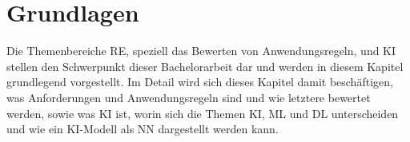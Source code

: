 \chapter{Grundlagen}
\label{chap:kapitel2}
Die Themenbereiche \ac{RE}, speziell das Bewerten von Anwendungsregeln, und \ac{KI} stellen den Schwerpunkt dieser Bachelorarbeit dar und werden in diesem Kapitel 
grundlegend vorgestellt. Im Detail wird sich dieses Kapitel damit beschäftigen, was Anforderungen und Anwendungsregeln sind und wie letztere bewertet werden,
sowie was \ac{KI} ist, worin sich die Themen \ac{KI}, \ac{ML} und \ac{DL} unterscheiden und wie ein \ac{KI}-Modell als \ac{NN} dargestellt werden kann. 






